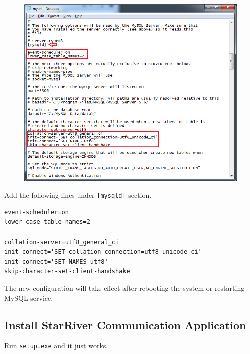 \begin{figure}[htbp]
\centering
\includegraphics{img/my_ini.png}
\caption{}
\end{figure}

Add the following lines under \texttt{{[}mysqld{]}} section.

\begin{verbatim}
event-scheduler=on
lower_case_table_names=2

collation-server=utf8_general_ci
init-connect='SET collation_connection=utf8_unicode_ci'
init-connect='SET NAMES utf8'
skip-character-set-client-handshake
\end{verbatim}

The new configuration will take effect after rebooting the system or
restarting MySQL service.

\subsection{Install StarRiver Communication
Application}\label{install-starriver-communication-application}

Run \texttt{setup.exe} and it just works.

